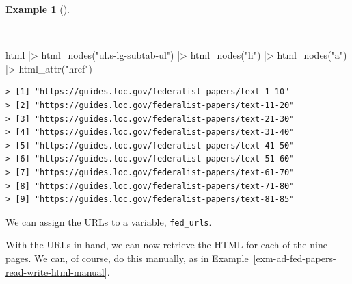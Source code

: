 \documentclass[
  letterpaper,
  DIV=11,
  numbers=noendperiod]{scrreport}
\newenvironment{Shaded}{\begin{snugshade}}{\end{snugshade}}
\newcommand{\FunctionTok}[1]{\textcolor[rgb]{0.00,0.00,0.00}{#1}}
\newcommand{\NormalTok}[1]{\textcolor[rgb]{0.00,0.00,0.00}{#1}}
\newcommand{\SpecialCharTok}[1]{\textcolor[rgb]{0.00,0.00,0.00}{#1}}
\newcommand{\StringTok}[1]{\textcolor[rgb]{0.00,0.00,0.00}{#1}}
\theoremstyle{definition}
\newtheorem{example}{Example}[chapter]
\theoremstyle{remark}
\begin{document}
\begin{example}[]\protect\hypertarget{exm-ad-fed-papers-loc-url-ul-li-a}{}\label{exm-ad-fed-papers-loc-url-ul-li-a}

~

\begin{Shaded}
\begin{Highlighting}[]
\NormalTok{html }\SpecialCharTok{|\textgreater{}} 
  \FunctionTok{html\_nodes}\NormalTok{(}\StringTok{"ul.s{-}lg{-}subtab{-}ul"}\NormalTok{) }\SpecialCharTok{|\textgreater{}} 
  \FunctionTok{html\_nodes}\NormalTok{(}\StringTok{"li"}\NormalTok{) }\SpecialCharTok{|\textgreater{}} 
  \FunctionTok{html\_nodes}\NormalTok{(}\StringTok{"a"}\NormalTok{) }\SpecialCharTok{|\textgreater{}} 
  \FunctionTok{html\_attr}\NormalTok{(}\StringTok{"href"}\NormalTok{)}
\end{Highlighting}
\end{Shaded}

\begin{verbatim}
> [1] "https://guides.loc.gov/federalist-papers/text-1-10" 
> [2] "https://guides.loc.gov/federalist-papers/text-11-20"
> [3] "https://guides.loc.gov/federalist-papers/text-21-30"
> [4] "https://guides.loc.gov/federalist-papers/text-31-40"
> [5] "https://guides.loc.gov/federalist-papers/text-41-50"
> [6] "https://guides.loc.gov/federalist-papers/text-51-60"
> [7] "https://guides.loc.gov/federalist-papers/text-61-70"
> [8] "https://guides.loc.gov/federalist-papers/text-71-80"
> [9] "https://guides.loc.gov/federalist-papers/text-81-85"
\end{verbatim}

\end{example}

We can assign the URLs to a variable, \texttt{fed\_urls}.

With the URLs in hand, we can now retrieve the HTML for each of the nine
pages. We can, of course, do this manually, as in
Example~\ref{exm-ad-fed-papers-read-write-html-manual}.
\end{document}
